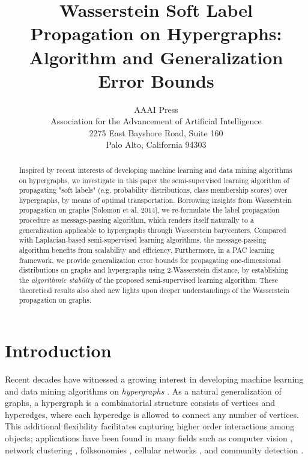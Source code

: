 \documentclass[letterpaper]{article} %
\begin{document}
\title{Wasserstein Soft Label Propagation on Hypergraphs: Algorithm and Generalization Error Bounds}
\author{AAAI Press\\
Association for the Advancement of Artificial Intelligence\\
2275 East Bayshore Road, Suite 160\\
Palo Alto, California 94303\\
}
\maketitle

\begin{abstract}
Inspired by recent interests of developing machine learning and data mining algorithms on hypergraphs, we investigate in this paper the semi-supervised learning algorithm of propagating "soft labels" (e.g. probability distributions, class membership scores) over hypergraphs, by means of optimal transportation. Borrowing insights from Wasserstein propagation on graphs [Solomon et al. 2014], we re-formulate the label propagation procedure as message-passing algorithm, which renders itself naturally to a generalization applicable to hypergraphs through Wasserstein barycenters. Compared with Laplacian-based semi-supervised learning algorithms, the message-passing algorithm benefits from scalability and efficiency. Furthermore, in a PAC learning framework, we provide generalization error bounds for propagating one-dimensional distributions on graphs and hypergraphs using 2-Wasserstein distance, by establishing the \textit{algorithmic stability} of the proposed semi-supervised learning algorithm. These theoretical results also shed new lights upon deeper understandings of the Wasserstein propagation on graphs. 
\end{abstract}
	
\section{Introduction}
Recent decades have witnessed a growing interest in developing machine learning and data mining algorithms on \emph{hypergraphs} \cite{Hypergraph_Clustering,Hypergraph_Jost,Hypergraph_Game,Hypergraph_Kannan,Hypergraph_Olgica,Hypergraph_TV,HypergraphScalable}. As a natural generalization of graphs, a hypergraph is a combinatorial structure consists of vertices and hyperedges, where each hyperedge is allowed to connect any number of vertices. This additional flexibility facilitates capturing higher order interactions among objects; applications have been found in many fields such as computer vision \cite{Govindu2005}, network clustering \cite{Hyper_Spatial}, folksonomies \cite{GZCN2009}, cellular networks \cite{KHT2009}, and community detection \cite{KBG2018}.
\end{document}

